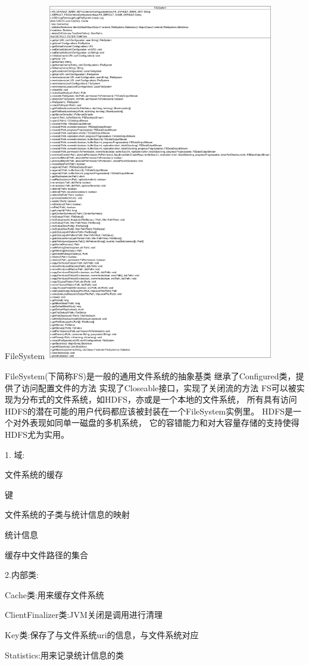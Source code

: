 \begin{XeClass}{FileSystem}
\includegraphics[width=10cm]{cdig/FileSystem.png}
     
 FileSystem(下简称FS)是一般的通用文件系统的抽象基类
 继承了Configured类，提供了访问配置文件的方法
 实现了Closeable接口，实现了关闭流的方法
 FS可以被实现为分布式的文件系统，如HDFS，亦或是一个本地的文件系统，
 所有具有访问HDFS的潜在可能的用户代码都应该被封装在一个FileSystem实例里。
 HDFS是一个对外表现如同单一磁盘的多机系统，
 它的容错能力和对大容量存储的支持使得HDFS尤为实用。
 
 1. 域:
 \begin{XeEnum}
 \item 文件系统的缓存
 \item 键
 \item 文件系统的子类与统计信息的映射
 \item 统计信息
 \item 缓存中文件路径的集合
 \end{XeEnum}
 
 2.内部类:
 \begin{XeEnum}
 \item Cache类:用来缓存文件系统
 \item ClientFinalizer类:JVM关闭是调用进行清理
 \item Key类:保存了与文件系统uri的信息，与文件系统对应
 \item Statistics:用来记录统计信息的类
 \end{XeEnum}
 

\end{XeClass}
